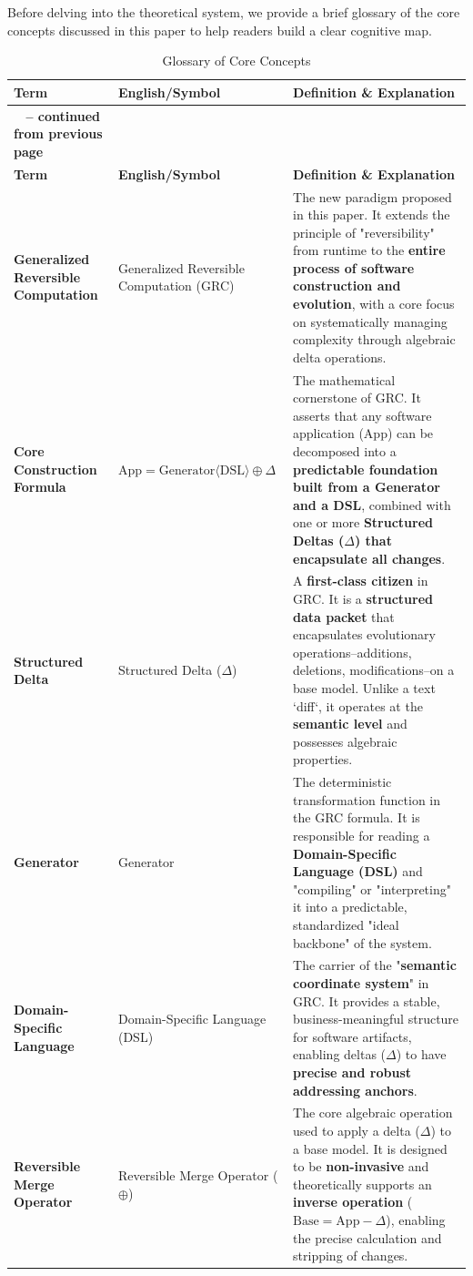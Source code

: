 \documentclass[11pt]{article}
\begin{document}
Before delving into the theoretical system, we provide a brief glossary of the core concepts discussed in this paper to help readers build a clear cognitive map.

\begin{longtable}{@{} >{\bfseries}L{4.5cm} >{\raggedright}L{3.5cm} p{0.5\textwidth} @{}}
\caption{Glossary of Core Concepts} \label{tab:glossary} \\
\toprule
\textbf{Term} & \textbf{English/Symbol} & \textbf{Definition \& Explanation} \\
\midrule
\endfirsthead
{}%
{{\bfseries \tablename\ \thetable{} -- continued from previous page}} \\
\toprule
\textbf{Term} & \textbf{English/Symbol} & \textbf{Definition \& Explanation} \\
\midrule
\endhead
\bottomrule
\endfoot
Generalized Reversible Computation & Generalized Reversible Computation (GRC) & The new paradigm proposed in this paper. It extends the principle of "reversibility" from runtime to the \textbf{entire process of software construction and evolution}, with a core focus on systematically managing complexity through algebraic delta operations. \\
\addlinespace
Core Construction Formula & $\text{App} = \text{Generator}\langle\text{DSL}\rangle \oplus \Delta$ & The mathematical cornerstone of GRC. It asserts that any software application (App) can be decomposed into a \textbf{predictable foundation built from a Generator and a DSL}, combined with one or more \textbf{Structured Deltas ($\Delta$) that encapsulate all changes}. \\
\addlinespace
Structured Delta & Structured Delta ($\Delta$) & A \textbf{first-class citizen} in GRC. It is a \textbf{structured data packet} that encapsulates evolutionary operations--additions, deletions, modifications--on a base model. Unlike a text `diff`, it operates at the \textbf{semantic level} and possesses algebraic properties. \\
\addlinespace
Generator & Generator & The deterministic transformation function in the GRC formula. It is responsible for reading a \textbf{Domain-Specific Language (DSL)} and "compiling" or "interpreting" it into a predictable, standardized "ideal backbone" of the system. \\
\addlinespace
Domain-Specific Language & Domain-Specific Language (DSL) & The carrier of the "\textbf{semantic coordinate system}" in GRC. It provides a stable, business-meaningful structure for software artifacts, enabling deltas ($\Delta$) to have \textbf{precise and robust addressing anchors}. \\
\addlinespace
Reversible Merge Operator & Reversible Merge Operator ($\oplus$) & The core algebraic operation used to apply a delta ($\Delta$) to a base model. It is designed to be \textbf{non-invasive} and theoretically supports an \textbf{inverse operation} ($\text{Base} = \text{App} - \Delta$), enabling the precise calculation and stripping of changes. \\
\end{longtable}
\end{document}
